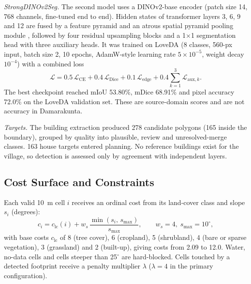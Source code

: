 \textit{StrongDINOv2Seg.} The second model uses a DINOv2-base encoder \cite{oquab2024dinov2} (patch size 14, 768 channels, fine-tuned end to end). Hidden states of transformer layers 3, 6, 9 and 12 are fused by a feature pyramid \cite{lin2017fpn} and an atrous spatial pyramid pooling module \cite{chen2018deeplab}, followed by four residual upsampling blocks and a 1$\times$1 segmentation head with three auxiliary heads. It was trained on LoveDA \cite{wang2021loveda} (8 classes, 560-px input, batch size 2, 10 epochs, AdamW-style learning rate $5\times10^{-5}$, weight decay $10^{-4}$) with a combined loss
\begin{equation}
\mathcal{L} = 0.5\,\mathcal{L}_{\mathrm{CE}} + 0.4\,\mathcal{L}_{\mathrm{Dice}} + 0.1\,\mathcal{L}_{\mathrm{edge}} + 0.4\sum_{k=1}^{3}\mathcal{L}_{\mathrm{aux},k}.
\end{equation}
The best checkpoint reached mIoU 53.80\%, mDice 68.91\% and pixel accuracy 72.0\% on the LoveDA validation set. These are source-domain scores and are not accuracy in Damarakunta. 

\textit{Targets.} The building extraction produced 278 candidate polygons (165 inside the boundary), grouped by quality into plausible, review and unresolved-merge classes. 163 house targets entered planning. No reference buildings exist for the village, so detection is assessed only by agreement with independent layers.

\subsection{Cost Surface and Constraints}
Each valid 10~m cell $i$ receives an ordinal cost from its land-cover class and slope $s_i$ (degrees):
\begin{equation}
c_i = c_{\mathrm{lc}}(i) + w_s \,\frac{\min(s_i,\,s_{\max})}{s_{\max}}, \qquad w_s = 4,\; s_{\max} = 10^\circ,
\label{eq:cost}
\end{equation}
with base costs $c_{\mathrm{lc}}$ of 8 (tree cover), 6 (cropland), 5 (shrubland), 4 (bare or sparse vegetation), 3 (grassland) and 2 (built-up), giving costs from 2.09 to 12.0. Water, no-data cells and cells steeper than 25$^\circ$ are hard-blocked. Cells touched by a detected footprint receive a penalty multiplier $\lambda$ ($\lambda = 4$ in the primary configuration).

